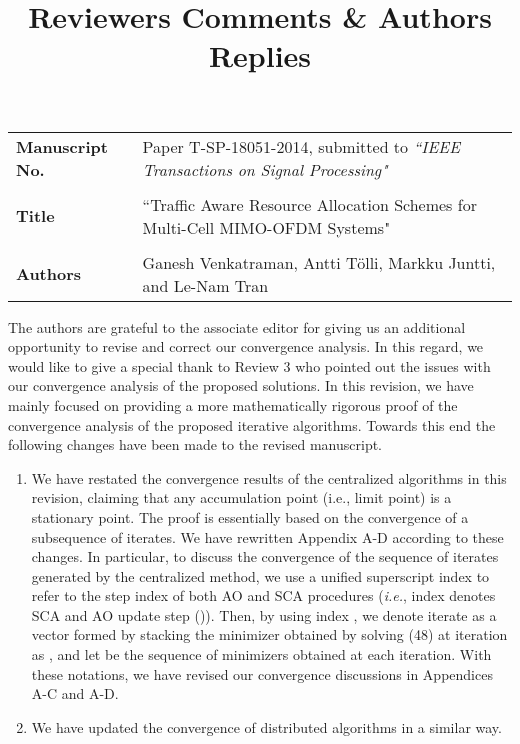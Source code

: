 \documentclass[10pt,letterpaper,onecolumn]{article}
\begin{document}
	
	\title{Reviewers Comments \& Authors Replies}
	
	\date{}
	\maketitle
	
	\begin{tabular}{p{1.25in}p{4.25in}}
		\textbf{Manuscript No.} & Paper T-SP-18051-2014, submitted to \emph{``IEEE Transactions on Signal Processing"} \\ \\
		\textbf{Title} & ``Traffic Aware Resource Allocation Schemes for Multi-Cell MIMO-OFDM Systems" \\ \\
		\textbf{Authors} & Ganesh Venkatraman, Antti T\"{o}lli, Markku Juntti, and Le-Nam Tran
	\end{tabular}
	
	\vspace{0.35in}
	The authors are grateful to the associate editor for giving us an additional opportunity to revise and correct our convergence analysis. In this regard, we would like to give a special thank to Review 3 who pointed out the issues with our convergence analysis of the proposed solutions. In this revision, we have mainly focused on providing a more mathematically rigorous  proof of the convergence analysis of the proposed iterative algorithms.
	Towards this end the following changes have been made to the revised manuscript.
	\begin{enumerate}
		\item We have restated the convergence results of the centralized algorithms in this revision, claiming that any accumulation point (i.e., limit point) is a stationary point. The proof is essentially based on the convergence of a subsequence of iterates. We have rewritten Appendix A-D according to these changes. In particular, to discuss the convergence of the sequence of iterates generated by the centralized method, we use a unified superscript index  to refer to the step index of both \ac{AO} and \ac{SCA} procedures (\textit{i.e.}, index  denotes \ac{SCA} and \ac{AO} update step ()). Then, by using index , we denote iterate  as a vector formed by stacking the minimizer obtained by solving (48) at iteration  as , and let  be the sequence of minimizers obtained at each iteration. With these notations, we have revised our convergence discussions in Appendices A-C and A-D.		
		\item We have updated the convergence of distributed algorithms in a similar way.
	\end{enumerate}
	
\end{document}
